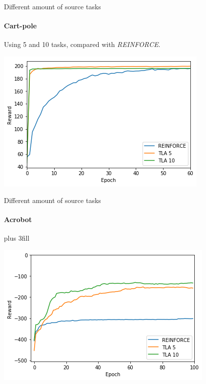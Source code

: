\begin{frame}[fragile]{Different amount of source tasks}
\framesubtitle{Cart-pole}
Using 5 and 10 tasks, compared with \textit{REINFORCE}.
\begin{center}
    \includegraphics[width=.8\linewidth]{results/CartPole/no_sparse_transfer/reward_target_re-akt5-akt10.png}
\end{center}
\end{frame}

\begin{frame}[fragile]{Different amount of source tasks}
\framesubtitle{Acrobot}
\vskip0pt plus 3fill
\begin{center}
    \includegraphics[width=.8\linewidth]{results/Acrobot/no_sparse_transfer/reward_target_re-akt5-akt10.png}
\end{center}
\end{frame}

